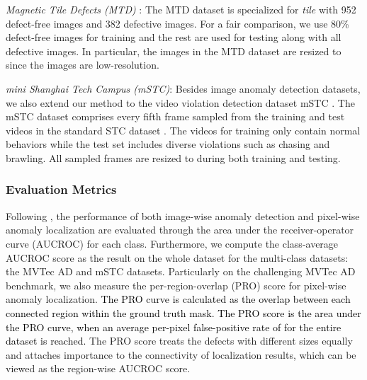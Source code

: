 \documentclass[lettersize,journal]{IEEEtran}
\newcommand{\rounda}[1]{\textcolor{black}{#1}}
\begin{document}
\textit{Magnetic Tile Defects (MTD)} \cite{huang2020mtd}:
The MTD dataset is specialized for \textit{tile} with 952 defect-free images and 382 defective images. For a fair comparison, we use 80\% defect-free images for training and the rest are used for testing along with all defective images. In particular, the images in the MTD dataset are resized to  since the images are low-resolution.

\textit{mini Shanghai Tech Campus (mSTC)}:
Besides image anomaly detection datasets, we also extend our method to the video violation detection dataset mSTC \cite{defard2021padim, roth2021patchcore}. The mSTC dataset comprises every fifth frame sampled from the training and test videos in the standard STC dataset \cite{luo2017stc}. The videos for training only contain normal behaviors while the test set includes diverse violations such as chasing and brawling. All sampled frames are resized to  during both training and testing.



\subsubsection{Evaluation Metrics}
Following \cite{bergmann2019mvtec}, the performance of both image-wise anomaly detection and pixel-wise anomaly localization are evaluated through the area under the receiver-operator curve (AUCROC) for each class. Furthermore, we compute the class-average AUCROC score as the result on the whole dataset for the multi-class datasets: the MVTec AD and mSTC datasets. Particularly on the challenging MVTec AD benchmark, we also measure the per-region-overlap (PRO) score \cite{bergmann2020uninformed} for pixel-wise anomaly localization. 
\rounda{The PRO curve is calculated as the overlap between each connected region within the ground truth mask. The PRO score is the area under the PRO curve, when an average per-pixel false-positive rate of  for the entire dataset is reached.}
The PRO score treats the defects with different sizes equally and attaches importance to the connectivity of localization results, which can be viewed as the region-wise AUCROC score.
\end{document}
